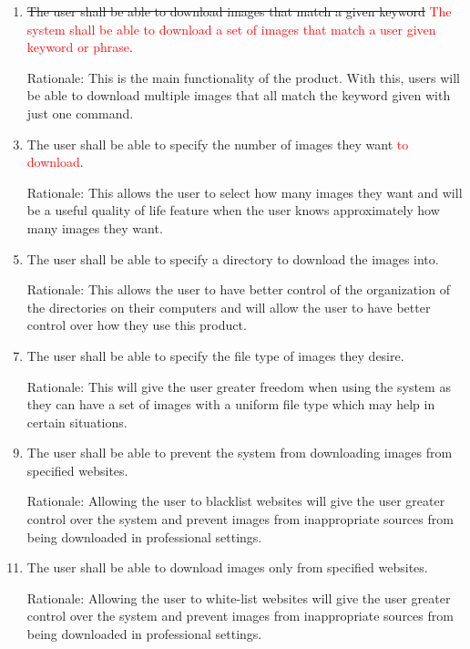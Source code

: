 \documentclass[12pt, titlepage]{article}
\begin{document}
\begin{enumerate}[label=FR\arabic*:, wide=0pt, leftmargin=*]
    \item \st{The user shall be able to download images that match a given keyword} \textcolor{red}{The system shall be able to download a set of images that match a user given keyword or phrase}.
    \item[Rationale:] This is the main functionality of the product. With this, users will be able to download multiple images that all match the keyword given with just one command.
    \\
    \item The user shall be able to specify the number of images they want \textcolor{red}{to download}.
    \item[Rationale:] This allows the user to select how many images they want and will be a useful quality of life feature when the user knows approximately how many images they want.
    \\
    \item The user shall be able to specify a directory to download the images into.
    \item[Rationale:] This allows the user to have better control of the organization of the directories on their computers and will allow the user to have better control over how they use this product.
    \\
    \item The user shall be able to specify the file type of images they desire.
    \item[Rationale:] This will give the user greater freedom when using the system as they can have a set of images with a uniform file type which may help in certain situations.
    \\
    \item The user shall be able to prevent the system from downloading images from specified websites.
    \item[Rationale:] Allowing the user to blacklist websites will give the user greater control over the system and prevent images from inappropriate sources from being downloaded in professional settings. 
    \\
    \item The user shall be able to download images only from specified websites.
    \item[Rationale:] Allowing the user to white-list websites will give the user greater control over the system and prevent images from inappropriate sources from being downloaded in professional settings. 

\end{enumerate}
\end{document}
